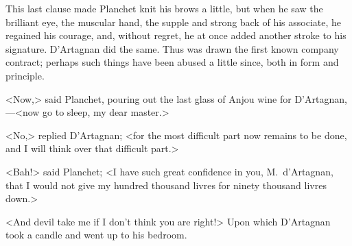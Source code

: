 This last clause made Planchet knit his brows a little, but when he saw the brilliant eye, the muscular hand, the supple and strong back of his associate, he regained his courage, and, without regret, he at once added another stroke to his signature. D'Artagnan did the same. Thus was drawn the first known company contract; perhaps such things have been abused a little since, both in form and principle.

<Now,> said Planchet, pouring out the last glass of Anjou wine for D'Artagnan,—<now go to sleep, my dear master.>

<No,> replied D'Artagnan; <for the most difficult part now remains to be done, and I will think over that difficult part.>

<Bah!> said Planchet; <I have such great confidence in you, M.~d'Artagnan, that I would not give my hundred thousand livres for ninety thousand livres down.>

<And devil take me if I don't think you are right!> Upon which D'Artagnan took a candle and went up to his bedroom. 